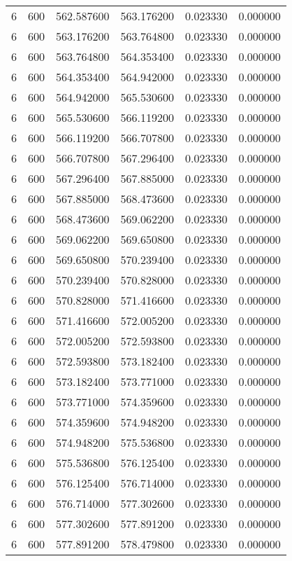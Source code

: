 \begin{longtable}{rrrrrr}
6 & 600 & 562.587600 & 563.176200 & 0.023330 & 0.000000 \\
6 & 600 & 563.176200 & 563.764800 & 0.023330 & 0.000000 \\
6 & 600 & 563.764800 & 564.353400 & 0.023330 & 0.000000 \\
6 & 600 & 564.353400 & 564.942000 & 0.023330 & 0.000000 \\
6 & 600 & 564.942000 & 565.530600 & 0.023330 & 0.000000 \\
6 & 600 & 565.530600 & 566.119200 & 0.023330 & 0.000000 \\
6 & 600 & 566.119200 & 566.707800 & 0.023330 & 0.000000 \\
6 & 600 & 566.707800 & 567.296400 & 0.023330 & 0.000000 \\
6 & 600 & 567.296400 & 567.885000 & 0.023330 & 0.000000 \\
6 & 600 & 567.885000 & 568.473600 & 0.023330 & 0.000000 \\
6 & 600 & 568.473600 & 569.062200 & 0.023330 & 0.000000 \\
6 & 600 & 569.062200 & 569.650800 & 0.023330 & 0.000000 \\
6 & 600 & 569.650800 & 570.239400 & 0.023330 & 0.000000 \\
6 & 600 & 570.239400 & 570.828000 & 0.023330 & 0.000000 \\
6 & 600 & 570.828000 & 571.416600 & 0.023330 & 0.000000 \\
6 & 600 & 571.416600 & 572.005200 & 0.023330 & 0.000000 \\
6 & 600 & 572.005200 & 572.593800 & 0.023330 & 0.000000 \\
6 & 600 & 572.593800 & 573.182400 & 0.023330 & 0.000000 \\
6 & 600 & 573.182400 & 573.771000 & 0.023330 & 0.000000 \\
6 & 600 & 573.771000 & 574.359600 & 0.023330 & 0.000000 \\
6 & 600 & 574.359600 & 574.948200 & 0.023330 & 0.000000 \\
6 & 600 & 574.948200 & 575.536800 & 0.023330 & 0.000000 \\
6 & 600 & 575.536800 & 576.125400 & 0.023330 & 0.000000 \\
6 & 600 & 576.125400 & 576.714000 & 0.023330 & 0.000000 \\
6 & 600 & 576.714000 & 577.302600 & 0.023330 & 0.000000 \\
6 & 600 & 577.302600 & 577.891200 & 0.023330 & 0.000000 \\
6 & 600 & 577.891200 & 578.479800 & 0.023330 & 0.000000 \\

\end{longtable}

